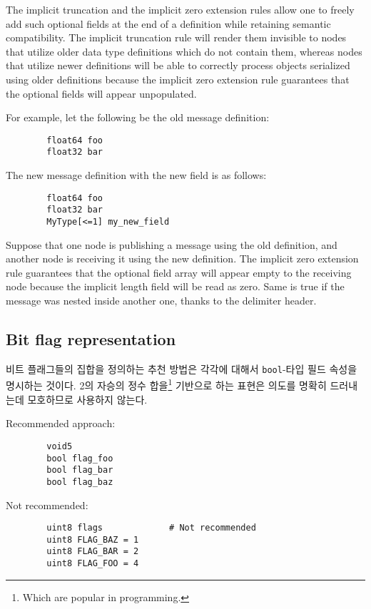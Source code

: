 \begin{remark}[breakable]
    The implicit truncation and the implicit zero extension rules allow one to freely add such optional fields
    at the end of a definition while retaining semantic compatibility.
    The implicit truncation rule will render them invisible to nodes that utilize older data type definitions
    which do not contain them, whereas nodes that utilize newer definitions will be able to correctly process
    objects serialized using older definitions because the implicit zero extension rule guarantees
    that the optional fields will appear unpopulated.

    For example, let the following be the old message definition:

    \begin{verbatim}
        float64 foo
        float32 bar
    \end{verbatim}

    The new message definition with the new field is as follows:

    \begin{verbatim}
        float64 foo
        float32 bar
        MyType[<=1] my_new_field
    \end{verbatim}

    Suppose that one node is publishing a message using the old definition,
    and another node is receiving it using the new definition.
    The implicit zero extension rule guarantees that the optional field array will
    appear empty to the receiving node because the implicit length field will be read as zero.
    Same is true if the message was nested inside another one, thanks to the delimiter header.
\end{remark}

\subsection{Bit flag representation}

비트 플래그들의 집합을 정의하는 추천 방법은 각각에 대해서 \verb|bool|-타입 필드 속성을 명시하는 것이다.
2의 자승의 정수 합을\footnote{Which are popular in programming.} 기반으로 하는 표현은 의도를 명확히 드러내는데 모호하므로 사용하지 않는다.

\begin{remark}
    Recommended approach:

    \begin{verbatim}
        void5
        bool flag_foo
        bool flag_bar
        bool flag_baz
    \end{verbatim}

    Not recommended:

    \begin{verbatim}
        uint8 flags             # Not recommended
        uint8 FLAG_BAZ = 1
        uint8 FLAG_BAR = 2
        uint8 FLAG_FOO = 4
    \end{verbatim}
\end{remark}
